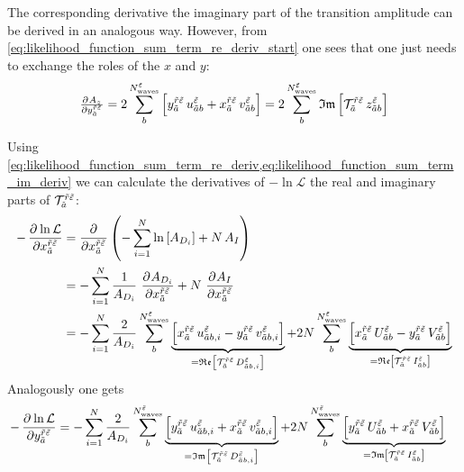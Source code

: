 The corresponding derivative \wrt the imaginary part of the transition
amplitude can be derived in an analogous way.  However, from
\cref{eq:likelihood_function_sum_term_re_deriv_start} one sees that
one just needs to exchange the roles of the $x$ and $y$:
\begin{equation}
  \label{eq:likelihood_function_sum_term_im_deriv}
  \pd{A_z}{{y_{\tilde{a}}^{\tilde{r} \tilde{\refl}}}}
  = 2 \sum_b^{N^{\tilde{\refl}}_\text{waves}} \sBrk{y_{\tilde{a}}^{\tilde{r} \tilde{\refl}}\, u^{\tilde{\refl}}_{\tilde{a} b}
    + x_{\tilde{a}}^{\tilde{r} \tilde{\refl}}\, v^{\tilde{\refl}}_{\tilde{a} b}}
  = 2 \sum_b^{N^{\tilde{\refl}}_\text{waves}} \Im\sBrk{\mathcal{T}_{\tilde{a}}^{\tilde{r} \tilde{\refl}}\, z^{\tilde{\refl}}_{\tilde{a} b}}
\end{equation}

Using
\cref{eq:likelihood_function_sum_term_re_deriv,eq:likelihood_function_sum_term_im_deriv}
we can calculate the derivatives of $-\ln \mathcal{L}$ \wrt the real
and imaginary parts of
$\mathcal{T}_{\tilde{a}}^{\tilde{r} \tilde{\varepsilon}}$:
\begin{align}
  -\dpd{\ln \mathcal{L}}{{x_{\tilde{a}}^{\tilde{r} \tilde{\refl}}}}
  &= \dpd{}{{x_{\tilde{a}}^{\tilde{r} \tilde{\refl}}}} \rBrk{-\sum_{i = 1}^{N} \ln \sBrk{A_{D_i}} + N\, A_I} \\
  &= -\sum_{i = 1}^{N} \frac{1}{A_{D_i}}\, \dpd{A_{D_i}}{{x_{\tilde{a}}^{\tilde{r} \tilde{\refl}}}}
  + N\, \dpd{A_I}{{x_{\tilde{a}}^{\tilde{r} \tilde{\refl}}}} \\
  \label{eq:likelihood_function_re_deriv}
  &= -\sum_{i = 1}^{N} \frac{2}{A_{D_i}} \sum_b^{N^{\tilde{\refl}}_\text{waves}} \underbrace{\sBrk{x_{\tilde{a}}^{\tilde{r} \tilde{\refl}}\, u^{\tilde{\refl}}_{\tilde{a} b, i}
    - y_{\tilde{a}}^{\tilde{r} \tilde{\refl}}\, v^{\tilde{\refl}}_{\tilde{a} b, i}}}_{= \Re\sBrk{\mathcal{T}_{\tilde{a}}^{\tilde{r} \tilde{\refl}}\, D^{\tilde{\refl}}_{\tilde{a} b, i}}}
    + 2 N \sum_b^{N^{\tilde{\refl}}_\text{waves}} \underbrace{\sBrk{x_{\tilde{a}}^{\tilde{r} \tilde{\refl}}\, U^{\tilde{\refl}}_{\tilde{a} b}
    - y_{\tilde{a}}^{\tilde{r} \tilde{\refl}}\, V^{\tilde{\refl}}_{\tilde{a} b}}}_{= \Re\sBrk{\mathcal{T}_{\tilde{a}}^{\tilde{r} \tilde{\refl}}\, I^{\tilde{\refl}}_{\tilde{a} b}}}
\end{align}
Analogously one gets
\begin{align}
  \label{eq:likelihood_function_im_deriv}
  -\dpd{\ln \mathcal{L}}{{y_{\tilde{a}}^{\tilde{r} \tilde{\refl}}}}
  &= -\sum_{i = 1}^{N} \frac{2}{A_{D_i}} \sum_b^{N^{\tilde{\refl}}_\text{waves}} \underbrace{\sBrk{y_{\tilde{a}}^{\tilde{r} \tilde{\refl}}\, u^{\tilde{\refl}}_{\tilde{a} b, i}
    + x_{\tilde{a}}^{\tilde{r} \tilde{\refl}}\, v^{\tilde{\refl}}_{\tilde{a} b, i}}}_{= \Im\sBrk{\mathcal{T}_{\tilde{a}}^{\tilde{r} \tilde{\refl}}\, D^{\tilde{\refl}}_{\tilde{a} b, i}}}
    + 2 N \sum_b^{N^{\tilde{\refl}}_\text{waves}} \underbrace{\sBrk{y_{\tilde{a}}^{\tilde{r} \tilde{\refl}}\, U^{\tilde{\refl}}_{\tilde{a} b}
    + x_{\tilde{a}}^{\tilde{r} \tilde{\refl}}\, V^{\tilde{\refl}}_{\tilde{a} b}}}_{= \Im\sBrk{\mathcal{T}_{\tilde{a}}^{\tilde{r} \tilde{\refl}}\, I^{\tilde{\refl}}_{\tilde{a} b}}}
\end{align}
